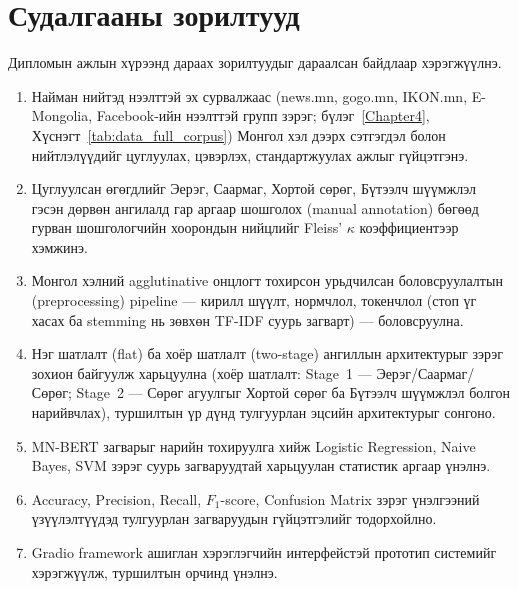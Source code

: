 \section{Судалгааны зорилтууд}

Дипломын ажлын хүрээнд дараах зорилтуудыг дараалсан байдлаар хэрэгжүүлнэ.

\begin{enumerate}
  \item Найман нийтэд нээлттэй эх сурвалжаас (news.mn, gogo.mn, IKON.mn,
        E-Mongolia, Facebook-ийн нээлттэй групп зэрэг; бүлэг~\ref{Chapter4},
        Хүснэгт~\ref{tab:data_full_corpus}) Монгол хэл дээрх сэтгэгдэл болон
        нийтлэлүүдийг цуглуулах, цэвэрлэх, стандартжуулах ажлыг гүйцэтгэнэ.

  \item Цуглуулсан өгөгдлийг Эерэг, Саармаг, Хортой сөрөг, Бүтээлч шүүмжлэл
        гэсэн дөрвөн ангилалд гар аргаар шошголох (manual
        annotation) бөгөөд гурван шошгологчийн хоорондын нийцлийг Fleiss' $\kappa$
        коэффициентээр хэмжинэ.

  \item Монгол хэлний agglutinative онцлогт тохирсон урьдчилсан боловсруулалтын
        (preprocessing) pipeline --- кирилл шүүлт, нормчлол, токенчлол (стоп үг
        хасах ба stemming нь зөвхөн TF-IDF суурь загварт) --- боловсруулна.

  \item Нэг шатлалт (flat) ба хоёр шатлалт (two-stage) ангиллын архитектурыг
        зэрэг зохион байгуулж харьцуулна (хоёр шатлалт: Stage~1 ---
        Эерэг/Саармаг/Сөрөг; Stage~2 --- Сөрөг агуулгыг Хортой сөрөг ба
        Бүтээлч шүүмжлэл болгон нарийвчлах), туршилтын үр дүнд тулгуурлан
        эцсийн архитектурыг сонгоно.

  \item MN-BERT загварыг нарийн тохируулга хийж Logistic Regression, Naive Bayes,
        SVM зэрэг суурь загваруудтай харьцуулан статистик аргаар үнэлнэ.

  \item Accuracy, Precision, Recall, $F_1$-score, Confusion Matrix зэрэг
        үнэлгээний үзүүлэлтүүдэд тулгуурлан загваруудын гүйцэтгэлийг
        тодорхойлно.

  \item Gradio framework ашиглан хэрэглэгчийн интерфейстэй прототип
        системийг хэрэгжүүлж, туршилтын орчинд үнэлнэ.
\end{enumerate}

